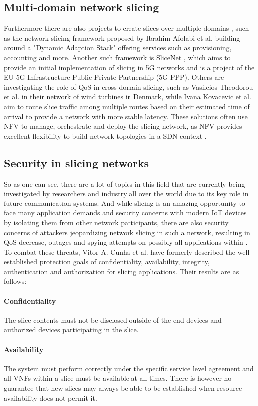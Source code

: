 \subsection{Multi-domain network slicing} Furthermore there are also projects to create slices over multiple domains \cite{MD1,MD2,MD3,MD4,MD5}, such as the network slicing framework proposed by Ibrahim Afolabi et al. \cite{MD1} building around a "Dynamic Adaption Stack" offering services such as provisioning, accounting and more. Another such framework is SliceNet \cite{MD3}, which aims to provide an initial implementation of slicing in 5G networks and is a project of the EU 5G Infrastructure Public Private Partnership (5G PPP). Others are investigating the role of QoS in cross-domain slicing, such as Vasileios Theodorou et al. \cite{MD4} in their network of wind turbines in Denmark, while Ivana Kovacevic et al. \cite{MD5} aim to route slice traffic among multiple routes based on their estimated time of arrival to provide a network with more stable latency. These solutions often use NFV to manage, orchestrate and deploy the slicing network, as NFV provides excellent flexibility to build network topologies in a SDN context \cite{5GSDN1,5GSDN2}.

\subsection{Security in slicing networks} So as one can see, there are a lot of topics in this field that are currently being investigated by researchers and industry all over the world due to its key role in future communication systems.  And while slicing is an amazing opportunity to face many application demands and security concerns with modern IoT devices by isolating them from other network participants, there are also security concerns of attackers jeopardizing network slicing in such a network, resulting in QoS decrease, outages and spying attempts on possibly all applications within \cite{SE1}. To combat these threats, Vitor A. Cunha et al. \cite{SE1} have formerly described the well established protection goals of confidentiality, availability, integrity, authentication and authorization for slicing applications. Their results are as follows:
\paragraph{Confidentiality} The slice contents must not be disclosed outside of the end devices and authorized devices participating in the slice.
\paragraph{Availability} The system must perform correctly under the specific service level agreement and all VNFs within a slice must be available at all times. There is however no guarantee that new slices may always be able to be established when resource availability does not permit it.
